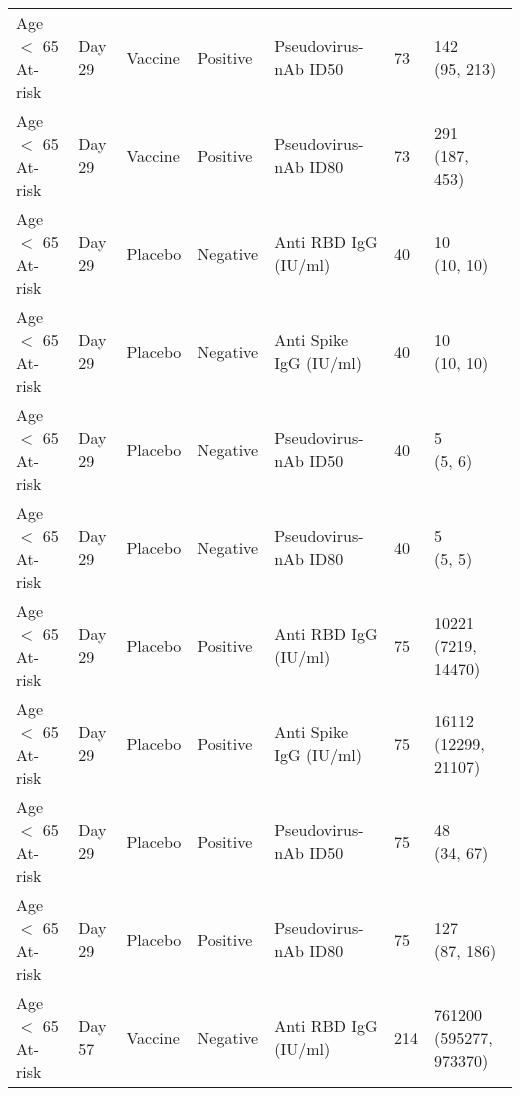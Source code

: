 \documentclass[]{book}
\theoremstyle{definition}
\theoremstyle{definition}
\theoremstyle{definition}
\newcommand{\1}{\mathbbm{1}}
\begin{document}
\begin{landscape}
\begin{ThreePartTable}
\begin{longtable}[t]{>{\raggedright\arraybackslash}p{7cm}llllll}
\hspace{1em}Age $<$ 65 At-risk & Day 29 & Vaccine & Positive & Pseudovirus-nAb ID50 & 73 & \makecell[l]{142\\(95, 213)}\\
\hspace{1em}Age $<$ 65 At-risk & Day 29 & Vaccine & Positive & Pseudovirus-nAb ID80 & 73 & \makecell[l]{291\\(187, 453)}\\
\hspace{1em}Age $<$ 65 At-risk & Day 29 & Placebo & Negative & Anti RBD IgG (IU/ml) & 40 & \makecell[l]{10\\(10, 10)}\\
\hspace{1em}Age $<$ 65 At-risk & Day 29 & Placebo & Negative & Anti Spike IgG (IU/ml) & 40 & \makecell[l]{10\\(10, 10)}\\
\hspace{1em}Age $<$ 65 At-risk & Day 29 & Placebo & Negative & Pseudovirus-nAb ID50 & 40 & \makecell[l]{5\\(5, 6)}\\
\hspace{1em}Age $<$ 65 At-risk & Day 29 & Placebo & Negative & Pseudovirus-nAb ID80 & 40 & \makecell[l]{5\\(5, 5)}\\
\hspace{1em}Age $<$ 65 At-risk & Day 29 & Placebo & Positive & Anti RBD IgG (IU/ml) & 75 & \makecell[l]{10221\\(7219, 14470)}\\
\hspace{1em}Age $<$ 65 At-risk & Day 29 & Placebo & Positive & Anti Spike IgG (IU/ml) & 75 & \makecell[l]{16112\\(12299, 21107)}\\
\hspace{1em}Age $<$ 65 At-risk & Day 29 & Placebo & Positive & Pseudovirus-nAb ID50 & 75 & \makecell[l]{48\\(34, 67)}\\
\hspace{1em}Age $<$ 65 At-risk & Day 29 & Placebo & Positive & Pseudovirus-nAb ID80 & 75 & \makecell[l]{127\\(87, 186)}\\
\hspace{1em}Age $<$ 65 At-risk & Day 57 & Vaccine & Negative & Anti RBD IgG (IU/ml) & 214 & \makecell[l]{761200\\(595277, 973370)}\\

\end{longtable}
\end{ThreePartTable}
\end{landscape}
\end{document}

